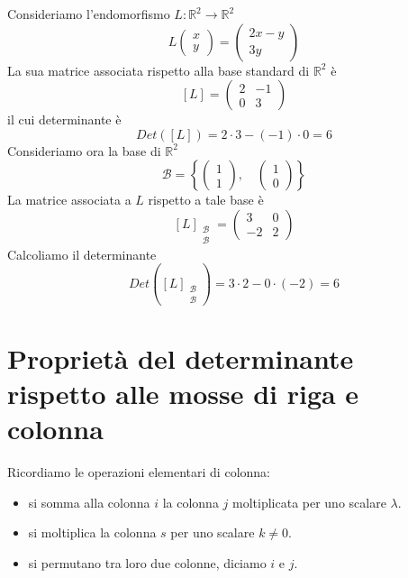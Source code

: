 \begin{example}
	Consideriamo l'endomorfismo $L : \mathbb{R}^2 \to \mathbb{R}^2$
	\[
		L \begin{pmatrix}
			x \\ y
		\end{pmatrix} =
		\begin{pmatrix}
			2x - y \\
			3y
		\end{pmatrix}
	\]
	La sua matrice associata rispetto alla base standard di $\mathbb{R}^2$ \`e
	\[
		[L] = \begin{pmatrix}
			2 & -1 \\
			0 & 3
		\end{pmatrix}
	\]
	il cui determinante \`e \[ Det([L]) = 2 \cdot 3 - (-1) \cdot 0 = 6 \]
	Consideriamo ora la base di $\mathbb{R}^2$
	\[
		\mathcal{B} =
		\left\{
		\begin{pmatrix} 1 \\ 1 \end{pmatrix}, \quad
		\begin{pmatrix} 1 \\ 0 \end{pmatrix}
		\right\}
	\]
	La matrice associata a $L$ rispetto a tale base \`e
	\[
		[L]_{\substack{\mathcal{B} \\ \mathcal{B}}} =
		\begin{pmatrix}
			3  & 0 \\
			-2 & 2
		\end{pmatrix}
	\]
	Calcoliamo il determinante
	\[
		Det \left( [L]_{\substack{\mathcal{B} \\ \mathcal{B}}} \right) =
		3 \cdot 2 - 0 \cdot (-2) = 6
	\]
\end{example}

\section{Propriet\`a del determinante rispetto alle mosse di riga e colonna}
Ricordiamo le operazioni elementari di colonna:
\begin{itemize}
	\item si somma alla colonna $i$ la colonna $j$ moltiplicata per uno
	      scalare $\lambda$.
	\item si moltiplica la colonna $s$ per uno scalare $k \neq 0$.
	\item si permutano tra loro due colonne, diciamo $i$ e $j$.
\end{itemize}

